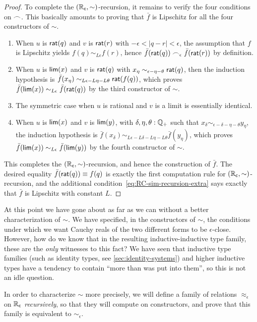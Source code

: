 \begin{proof}
  To complete the $(\mathbb{R}_\mathsf{c},\sim)$-recursion, it remains to verify the four conditions on $\frown$.
  This basically amounts to proving that $\bar f$ is Lipschitz for all the four constructors of $\sim$.
  \begin{enumerate}
  \item When $u$ is $\mathsf{rat}(q)$ and $v$ is $\mathsf{rat}(r)$ with $-\epsilon < |q-r| <\epsilon$, the assumption that $f$ is Lipschitz yields $f(q) \sim_{L\epsilon} f(r)$, hence $\bar{f}(\mathsf{rat}(q)) \frown_\epsilon \bar{f}(\mathsf{rat}(r))$ by definition.
  \item When $u$ is $\mathsf{lim}(x)$ and $v$ is $\mathsf{rat}(q)$ with $x_\eta \sim_{\epsilon - \eta - \theta} \mathsf{rat}(q)$, then the
      induction hypothesis is $\bar{f}(x_\eta) \sim_{L \epsilon - L \eta - L \theta} \mathsf{rat}(f(q))$, which proves $\bar{f}(\mathsf{lim}(x)) \sim_{L \epsilon}
      \bar{f}(\mathsf{rat}(q))$ by the third constructor of $\sim$.
  \item The symmetric case when $u$ is rational and $v$ is a limit is essentially identical.
  \item When $u$ is $\mathsf{lim}(x)$ and $v$ is $\mathsf{lim}(y)$, with $\delta, \eta, \theta : \mathbb{Q}_{+}$ such that $x_\delta \sim_{\epsilon - \delta - \eta - \theta} y_\eta$,
      the induction hypothesis is $\bar{f}(x_\delta) \sim_{L \epsilon - L \delta - L \eta - L \theta} \bar{f}(y_\eta)$, which proves $\bar{f}(\mathsf{lim}(x)) \sim_{L
        \epsilon} \bar{f}(\mathsf{lim}(y))$ by the fourth constructor of $\sim$.
  \end{enumerate}
  This completes the $(\mathbb{R}_\mathsf{c},\sim)$-recursion, and hence the construction of $\bar f$.
  The desired equality $\bar f(\mathsf{rat}(q))\equiv f(q)$ is exactly the first computation rule for $(\mathbb{R}_\mathsf{c},\sim)$-recursion, and the additional condition~\eqref{eq:RC-sim-recursion-extra} says exactly that $\bar f$ is Lipschitz with constant $L$.
\end{proof}

At this point we have gone about as far as we can without a better characterization of $\sim$.
We have specified, in the constructors of $\sim$, the conditions under which we want Cauchy reals of the two different forms to be $\epsilon$-close.
However, how do we know that in the resulting inductive-inductive type family, these are the \emph{only} witnesses to this fact?
We have seen that inductive type families (such as identity types, see \autoref{sec:identity-systems}) and higher inductive types have a tendency to contain ``more than was put into them'', so this is not an idle question.

In order to characterize $\sim$ more precisely, we will define a family of relations $\approx_\epsilon$ on $\mathbb{R}_\mathsf{c}$ \emph{recursively}, so that they will compute on constructors, and prove that this family is equivalent to $\sim_\epsilon$.

